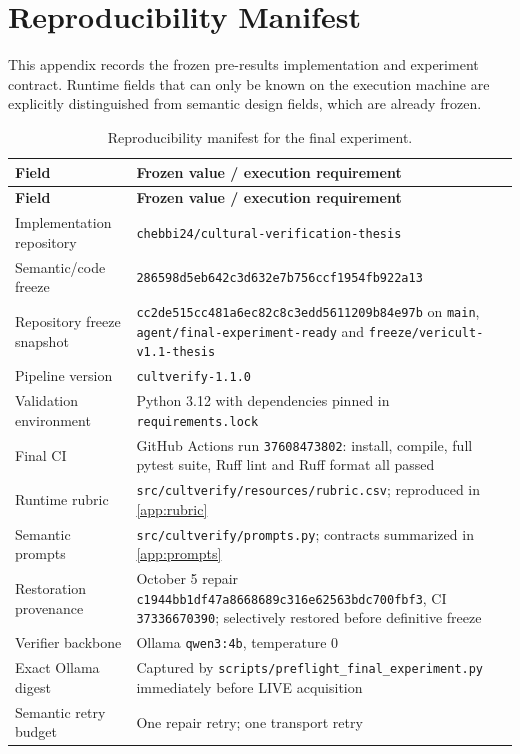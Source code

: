 \chapter{Reproducibility Manifest}
\label{app:repro}

This appendix records the frozen pre-results implementation and experiment contract. Runtime fields that can only be known on the execution machine are explicitly distinguished from semantic design fields, which are already frozen.

\begin{longtable}{p{4.7cm}p{8.9cm}}
\caption{Reproducibility manifest for the final experiment.}\label{tab:repro-manifest}\\
\toprule
\textbf{Field} & \textbf{Frozen value / execution requirement} \\
\midrule
\endfirsthead
\toprule
\textbf{Field} & \textbf{Frozen value / execution requirement} \\
\midrule
\endhead
Implementation repository & \texttt{chebbi24/cultural-verification-thesis} \\
Semantic/code freeze & \texttt{286598d5eb642c3d632e7b756ccf1954fb922a13} \\
Repository freeze snapshot & \texttt{cc2de515cc481a6ec82c8c3edd5611209b84e97b} on \texttt{main}, \texttt{agent/final-experiment-ready} and \texttt{freeze/vericult-v1.1-thesis} \\
Pipeline version & \texttt{cultverify-1.1.0} \\
Validation environment & Python 3.12 with dependencies pinned in \texttt{requirements.lock} \\
Final CI & GitHub Actions run \texttt{37608473802}: install, compile, full pytest suite, Ruff lint and Ruff format all passed \\
Runtime rubric & \texttt{src/cultverify/resources/rubric.csv}; reproduced in \cref{app:rubric} \\
Semantic prompts & \texttt{src/cultverify/prompts.py}; contracts summarized in \cref{app:prompts} \\
Restoration provenance & October 5 repair \texttt{c1944bb1df47a8668689c316e62563bdc700fbf3}, CI \texttt{37336670390}; selectively restored before definitive freeze \\
Verifier backbone & Ollama \texttt{qwen3:4b}, temperature 0 \\
Exact Ollama digest & Captured by \texttt{scripts/preflight\_final\_experiment.py} immediately before LIVE acquisition \\
Semantic retry budget & One repair retry; one transport retry \\

\end{longtable}
